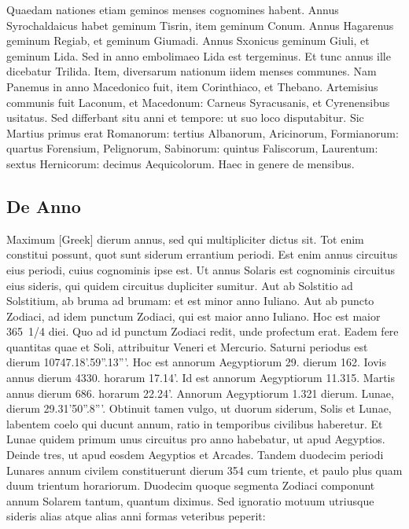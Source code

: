 Quaedam nationes etiam geminos menses cognomines habent.
Annus Syrochaldaicus habet geminum Tisrin, item geminum Conum.
Annus Hagarenus geminum Regiab, et geminum Giumadi.
Annus Sxonicus geminum Giuli, et geminum Lida.
Sed in
anno embolimaeo Lida est tergeminus.
Et tunc annus ille dicebatur
Trilida.
Item, diversarum nationum iidem menses communes.
Nam
Panemus in anno Macedonico fuit, item Corinthiaco, et Thebano.
Artemisius communis fuit Laconum, et Macedonum: Carneus Syracusanis,
et Cyrenensibus usitatus.
Sed differbant situ anni et tempore:
ut suo loco disputabitur.
Sic Martius primus erat Romanorum:
tertius Albanorum, Aricinorum, Formianorum: quartus Forensium,
Pelignorum, Sabinorum: quintus Faliscorum, Laurentum:
sextus Hernicorum: decimus Aequicolorum.
Haec in genere
de mensibus.

\subsection{De Anno}

Maximum \textgreek{[Greek]}
 dierum annus, sed qui multipliciter dictus
sit.
Tot enim constitui possunt, quot sunt siderum errantium
periodi.
Est enim annus circuitus eius periodi, cuius cognominis
ipse est.
Ut annus Solaris est cognominis circuitus eius sideris,
qui quidem circuitus dupliciter sumitur.
Aut ab Solstitio ad Solstitium,
ab bruma ad brumam: et est minor anno Iuliano.
Aut ab puncto Zodiaci,
ad idem punctum Zodiaci, qui est maior anno Iuliano.
Hoc est maior 365~1/4 diei.
Quo ad id punctum Zodiaci redit, unde profectum
erat.
Eadem fere quantitas quae et Soli, attribuitur Veneri et Mercurio.
Saturni periodus est dierum 10747.18'.59''.13'''.
Hoc est annorum
Aegyptiorum 29. dierum 162.
Iovis annus dierum 4330. horarum 17.14'.
Id est annorum Aegyptiorum 11.315.
Martis annus dierum
686. horarum 22.24'.
Annorum Aegyptiorum 1.321 dierum.
Lunae,
dierum 29.31'50''.8'''.
Obtinuit tamen vulgo, ut duorum siderum,
Solis et Lunae, labentem coelo qui ducunt annum, ratio in temporibus
civilibus haberetur.
Et Lunae quidem primum unus circuitus
pro anno habebatur, ut apud Aegyptios.
Deinde tres, ut apud eosdem
Aegyptios et Arcades.
Tandem duodecim periodi Lunares annum
civilem constituerunt dierum 354 cum triente, et paulo plus quam
duum trientum horariorum.
Duodecim quoque segmenta Zodiaci
componunt annum Solarem tantum, quantum diximus.
Sed ignoratio
motuum utriusque sideris alias atque alias anni formas veteribus
peperit:

